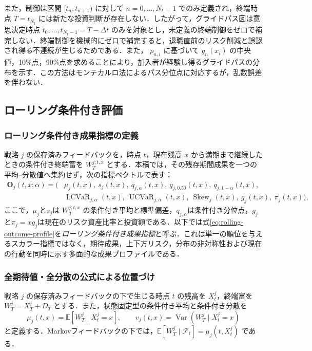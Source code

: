 \documentclass[10pt,a4paper]{article}
\theoremstyle{plain}
\theoremstyle{definition}
\newcommand{\E}{\mathbb{E}}
\DeclareMathOperator{\Var}{Var}
\begin{document}
また，制御は区間 $[t_n,t_{n+1})$ に対して $n=0,\ldots,N_t-1$ でのみ定義され，終端時点 $T=t_{N_t}$ には新たな投資判断が存在しない．したがって，グライドパス図は意思決定時点 $t_0,\ldots,t_{N_t-1}=T-\Delta t$ のみを対象とし，未定義の終端制御をゼロで補完しない．終端制御を機械的にゼロで補完すると，退職直前のリスク削減と誤認され得る不連続が生じるためである．また， $p_{n,i}$ に基づいて $g_n(x_i)$ の中央値，10\%点，90\%点を求めることにより，加入者が経験し得るグライドパスの分布を示す．この方法はモンテカルロ法によるパス分位点に対応するが，乱数誤差を伴わない．

\label{sec:rolling-definition}
\subsection{ローリング条件付き評価}
\label{sec:rolling}

\subsubsection{ローリング条件付き成果指標の定義}

戦略 $j$ の保存済みフィードバックを，時点 $t$，現在残高 $x$ から満期まで継続したときの条件付き終端富を $W_T^{j;t,x}$ とする．本稿では，その残存期間成果を一つの平均--分散値へ集約せず，次の指標ベクトルで表す：
\begin{equation}
\begin{split}
 \mathbf O_j(t,x;\alpha)=\bigl(&\mu_j(t,x),\ s_j(t,x),\ q_{j,\alpha}(t,x),\ q_{j,0.50}(t,x),\ q_{j,1-\alpha}(t,x),\\
 &\operatorname{LCVaR}_{j,\alpha}(t,x),\ \operatorname{UCVaR}_{j,\alpha}(t,x),\ \operatorname{Skew}_j(t,x),\ g_j(t,x),\ \pi_j(t,x)\bigr),
 \label{eq:rolling-outcome-profile}
\end{split}
\end{equation}
ここで，$\mu_j$と$s_j$は $W_T^{j;t,x}$ の条件付き平均と標準偏差，$q_{j,\alpha}$は条件付き分位点，$g_j$と$\pi_j=xg_j$は現在のリスク資産比率と投資額である．以下では式\eqref{eq:rolling-outcome-profile}を\emph{ローリング条件付き成果指標}と呼ぶ．これは単一の順位を与えるスカラー指標ではなく，期待成果，上下方リスク，分布の非対称性および現在の行動を同時に示す多面的な成果プロファイルである．

\subsubsection{全期待値・全分散の公式による位置づけ}

戦略 $j$ の保存済みフィードバックの下で生じる時点 $t$ の残高を $X_t^j$，終端富を $W_T^j=X_T^j+D_T$ とする．また，状態固定型の条件付き平均と条件付き分散を
\begin{equation}
  \mu_j(t,x)=\E\!\left[W_T^j\mid X_t^j=x\right],
  \qquad
  v_j(t,x)=\Var\!\left(W_T^j\mid X_t^j=x\right)
  \label{eq:rolling-conditional-moments}
\end{equation}
と定義する．Markovフィードバックの下では，$\E[W_T^j\mid\mathcal F_t]=\mu_j(t,X_t^j)$ である．
\end{document}
